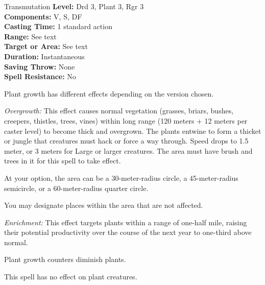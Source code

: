{Transmutation}
{
	\textbf{Level:}
	Drd 3, Plant 3, Rgr 3\\
	\textbf{Components:}
	V, S, DF\\
	\textbf{Casting Time:}
	1 standard action\\
	\textbf{Range:}
	See text\\
	\textbf{Target or Area:}
	See text\\
	\textbf{Duration:}
	Instantaneous\\
	\textbf{Saving Throw:}
	None\\
	\textbf{Spell Resistance:}
	No\\
}
{
	Plant growth has different effects depending on the version chosen.

	\textit{Overgrowth:}
	This effect causes normal vegetation (grasses, briars, bushes, creepers, thistles, trees, vines) within long range (120 meters + 12 meters per caster level) to become thick and overgrown. The plants entwine to form a thicket or jungle that creatures must hack or force a way through. Speed drops to 1.5 meter, or 3 meters for Large or larger creatures. The area must have brush and trees in it for this spell to take effect.

	At your option, the area can be a 30-meter-radius circle, a 45-meter-radius semicircle, or a 60-meter-radius quarter circle.

	You may designate places within the area that are not affected.

	\textit{Enrichment:}
	This effect targets plants within a range of one-half mile, raising their potential productivity over the course of the next year to one-third above normal.

	Plant growth counters diminish plants.

	This spell has no effect on plant creatures.

}

